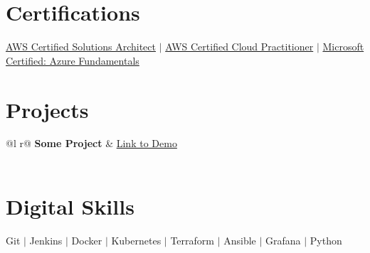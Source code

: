 \documentclass[a4paper,12pt]{article}
\begin{document}
\section{Certifications}
\small{\href{https://bit.ly/shagok-saa}{AWS Certified Solutions Architect} $|$ \href{https://bit.ly/shagok-aws}{AWS Certified Cloud Practitioner} $|$ \href{https://bit.ly/shagok-azure}{Microsoft Certified: Azure Fundamentals}}
\section{Projects}

\begin{tabularx}{\linewidth}{ @{}l r@{} }
\textbf{Some Project} & \hfill \href{https://some-link.com}{Link to Demo} \\[3.75pt]
  \\
\end{tabularx}
\section{Digital Skills}
Git $|$ Jenkins $|$ Docker $|$ Kubernetes $|$ Terraform $|$ Ansible $|$ Grafana $|$ Python
\vfill
{}
\end{document}
